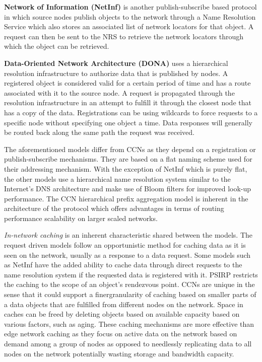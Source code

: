 \documentclass[a4paper,12pt]{report}      %
\begin{document}
\begin{descripton}
\textbf{Network of Information (NetInf)} is another publish-subscribe based protocol in which source nodes
publish objects to the network through a Name Resolution Service which also stores an associated list
of network locators for that object. A request can then be sent to the NRS to retrieve the network
locators through which the object can be retrieved.

\textbf{Data-Oriented Network Architecture (DONA)} uses a hierarchical resolution infrastructure to
authorize data that is published by nodes. A registered object is considered valid for a certain period of
time and has a route associated with it to the source node. A request is propagated through the
resolution infrastructure in an attempt to fulfill it through the closest node that has a copy of the data.
Registrations can be using wildcards to force requests to a specific node without specifying one object
a time. Data responses will generally be routed back along the same path the request was received.

The aforementioned models differ from CCNs as they depend on a registration or publish-subscribe
mechanisms. They are based on a flat naming scheme used for their addressing mechanism. With the
exception of NetInf which is purely flat, the other models use a hierarchical name resolution system
similar to the Internet's DNS architecture and make use of Bloom filters for improved look-up
performance. The CCN hierarchical prefix aggregation model is inherent in the architecture of the
protocol which offers advantages in terms of routing performance scalability on larger scaled networks.

\emph{In-network caching} is an inherent characteristic shared between the models. The request driven models
follow an opportunistic method for caching data as it is seen on the network, usually as a response to a
data request. Some models such as NetInf have the added ability to cache data through direct requests
to the name resolution system if the requested data is registered with it. PSIRP restricts the caching to
the scope of an object's rendezvous point. CCNs are unique in the sense that it could support a finergranularity of caching based on smaller parts of a data objects that are fulfilled from different nodes on
the network. Space in caches can be freed by deleting objects based on available capacity based on
various factors, such as aging. These caching mechanisms are more effective than edge network
caching as they focus on active data on the network based on demand among a group of nodes as
opposed to needlessly replicating data to all nodes on the network potentially wasting storage and
bandwidth capacity.


\end{descripton}
\end{document}
